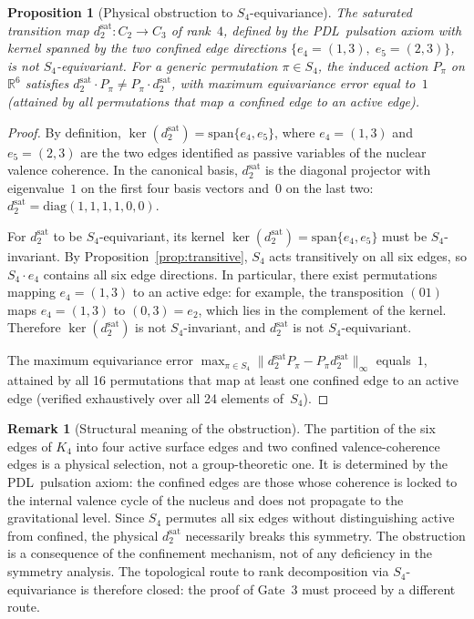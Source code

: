 \documentclass[11pt,a4paper]{article}
\newtheorem{proposition}[theorem]{Proposition}
\theoremstyle{definition}
\newtheorem{remark}[theorem]{Remark}
\newcommand{\PDL}{\textnormal{PDL}}
\newcommand{\Kfour}{K_4}
\newcommand{\dmap}{d_2}
\begin{document}
\begin{proposition}[Physical obstruction to $S_4$-equivariance]
\label{prop:obstruction}
The saturated transition map $\dmap^{\mathrm{sat}}: C_2 \to C_3$ of rank~$4$, defined by the \PDL\ pulsation axiom with kernel spanned by the two confined edge directions $\{e_4 = (1,3),\; e_5 = (2,3)\}$, is \emph{not} $S_4$-equivariant. For a generic permutation $\pi \in S_4$, the induced action $P_\pi$ on $\mathbb{R}^6$ satisfies $\dmap^{\mathrm{sat}}\cdot P_\pi \neq P_\pi\cdot\dmap^{\mathrm{sat}}$, with maximum equivariance error equal to~$1$ (attained by all permutations that map a confined edge to an active edge).
\end{proposition}

\begin{proof}
By definition, $\ker(\dmap^{\mathrm{sat}}) = \mathrm{span}\{e_4, e_5\}$, where $e_4 = (1,3)$ and $e_5 = (2,3)$ are the two edges identified as passive variables of the nuclear valence coherence. In the canonical basis, $\dmap^{\mathrm{sat}}$ is the diagonal projector with eigenvalue~$1$ on the first four basis vectors and~$0$ on the last two: $\dmap^{\mathrm{sat}} = \mathrm{diag}(1,1,1,1,0,0)$.

For $\dmap^{\mathrm{sat}}$ to be $S_4$-equivariant, its kernel $\ker(\dmap^{\mathrm{sat}}) = \mathrm{span}\{e_4,e_5\}$ must be $S_4$-invariant. By Proposition~\ref{prop:transitive}, $S_4$ acts transitively on all six edges, so $S_4\cdot e_4$ contains all six edge directions. In particular, there exist permutations mapping $e_4 = (1,3)$ to an active edge: for example, the transposition $(01)$ maps $e_4 = (1,3)$ to $(0,3) = e_2$, which lies in the complement of the kernel. Therefore $\ker(\dmap^{\mathrm{sat}})$ is not $S_4$-invariant, and $\dmap^{\mathrm{sat}}$ is not $S_4$-equivariant.

The maximum equivariance error $\max_{\pi \in S_4} \|\dmap^{\mathrm{sat}} P_\pi - P_\pi\dmap^{\mathrm{sat}}\|_\infty$ equals~$1$, attained by all 16 permutations that map at least one confined edge to an active edge (verified exhaustively over all 24 elements of~$S_4$).
\end{proof}

\begin{remark}[Structural meaning of the obstruction]
The partition of the six edges of $\Kfour$ into four active surface edges and two confined valence-coherence edges is a physical selection, not a group-theoretic one. It is determined by the \PDL\ pulsation axiom: the confined edges are those whose coherence is locked to the internal valence cycle of the nucleus and does not propagate to the gravitational level. Since $S_4$ permutes all six edges without distinguishing active from confined, the physical $\dmap^{\mathrm{sat}}$ necessarily breaks this symmetry. The obstruction is a consequence of the confinement mechanism, not of any deficiency in the symmetry analysis. The topological route to rank decomposition via $S_4$-equivariance is therefore closed: the proof of Gate~3 must proceed by a different route.
\end{remark}
\end{document}
